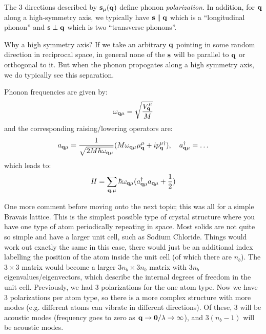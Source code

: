 The 3 directions described by $\mathbf{s}_\mu(\mathbf{q})$ define phonon \emph{polarization}. In addition, for $\mathbf{q}$ along a high-symmetry axis, we typically have $\mathbf{s} \parallel \mathbf{q}$ which is a ``longitudinal phonon'' and $\mathbf{s} \perp \mathbf{q}$ which is two ``transverse phonons''.

Why a high symmetry axis? If we take an arbitrary $\mathbf{q}$ pointing in some random direction in reciprocal space, in general none of the $\mathbf{s}$ will be parallel to $\mathbf{q}$ or orthogonal to it. But when the phonon propogates along a high symmetry axis, we do typically see this separation.

Phonon frequencies are given by:
\begin{equation}
    \omega_{\mathbf{q}\mu} = \sqrt{\frac{V_{\mathbf{q}}^\mu}{M}}
\end{equation}
and the corresponding raising/lowering operators are:
\begin{equation}
    a_{\mathbf{q}\mu} = \frac{1}{\sqrt{2M\hbar \omega_{\mathbf{q}\mu}}}(M\omega_{\mathbf{q}\mu}\mu^\mu_{\mathbf{q}} + ip_{\mathbf{q}}^{\mu\dagger}), \quad a_{\mathbf{q}\mu}^\dagger = \ldots
\end{equation}
which leads to:
\begin{equation}
    H = \sum_{\mathbf{q}, \mu}\hbar \omega_{\mathbf{q}\mu}(a^{\dagger}_{\mathbf{q}\mu}a_{\mathbf{q}\mu} + \frac{1}{2})
\end{equation}

One more comment before moving onto the next topic; this was all for a simple Bravais lattice. This is the simplest possible type of crystal structure where you have one type of atom periodically repeating in space. Most solids are not quite so simple and have a larger unit cell, such as Sodium Chloride. Things would work out exactly the same in this case, there would just be an additional index labelling the position of the atom inside the unit cell (of which there are $n_b$). The $3 \times 3$ matrix would become a larger $3n_b \times 3n_b$ matrix with $3n_b$ eigenvalues/eigenvectors, which describe the internal degrees of freedom in the unit cell. Previously, we had 3 polarizations for the one atom type. Now we have 3 polarizations per atom type, so there is a more complex structure with more modes (e.g. different atoms can vibrate in different directions). Of these, 3 will be acoustic modes (frequency goes to zero as $\mathbf{q} \to \mathbf{0}/\lambda \to \infty$), and $3(n_b - 1)$ will be acoustic modes.

